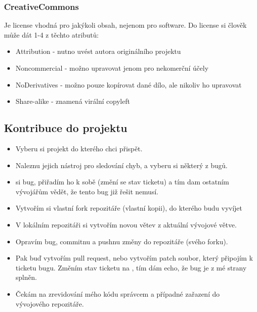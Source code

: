 \subsubsection{CreativeCommons}
Je license vhodná pro jakýkoli obsah, nejenom pro software. Do license si člověk může dát 1-4 z těchto atributů:
\begin{itemize}[itemsep=0px]
\item Attribution - nutno uvést autora originálního projektu
\item Noncommercial - možno upravovat jenom pro nekomerční účely
\item NoDerivatives - možno pouze kopírovat dané dílo, ale nikoliv ho upravovat
\item Share-alike - znamená virální copyleft
\end{itemize}


\subsection{Kontribuce do projektu}
\begin{itemize}[itemsep=0px]
\item Vyberu si projekt do kterého chci přispět.
\item Naleznu jejich nástroj pro sledování chyb, a vyberu si některý z bugů.
\item {} si bug, přiřadím ho k sobě (změní se stav ticketu) a tím dam ostatním vývojářům vědět, že tento bug již řešit nemusí.
\item Vytvořím si vlastní fork repozitáře (vlastní kopii), do kterého budu vyvíjet
\item V lokálním repozitáři si vytvořím novou větev z aktuální vývojové větve.
\item Opravím bug, commitnu a pushnu změny do repozitáře (svého forku).
\item Pak buď vytvořím pull request, nebo vytvořím patch soubor, který připojím k ticketu bugu. Změním stav ticketu na , tím dám echo, že bug je z mé strany splněn.
\item Čekám na zrevidování mého kódu správcem a případné zařazení do vývojového repozitáře.
\end{itemize}
